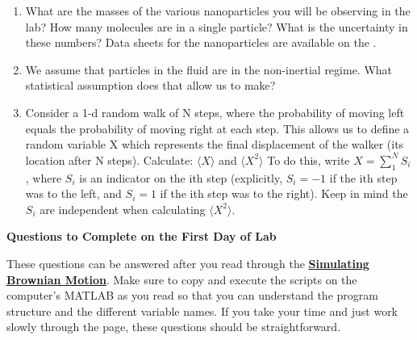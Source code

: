 \documentclass{../signatures}
\begin{document}
\maketitle

\names

\prelab

\begin{enumerate}

    \item What are the masses of the various nanoparticles you will be observing in the lab? How many molecules are in a single particle? What is the uncertainty in these numbers? Data sheets for the nanoparticles are available on the \ExpReprints.
    
    \item We assume that particles in the fluid are in the non-inertial regime. What statistical assumption does that allow us to make? 

    \item Consider a 1-d random walk of N steps, where the probability of moving left equals the probability of moving right at each step. This allows us to define a random variable X  which represents the final displacement of the walker (its location after N steps). Calculate: $\langle X \rangle$ and $\langle X^2\rangle$ To do this, write $X=\sum_{1}^{N} S_i $, where $S_i$ is an indicator on the ith step (explicitly, $S_i=-1$ if the ith step was to the left, and $S_i=1$ if the ith step was to the right). Keep in mind the $S_i$ are independent when calculating $\langle X^2\rangle$.
       \\[36pt]
\end{enumerate}

\prelabsignatures

\textbf{Questions to Complete on the First Day of Lab}

These questions can be answered after you read through the \href{http://experimentationlab.berkeley.edu/node/83}{\textbf{Simulating Brownian Motion}}. Make sure to copy and execute the scripts on the computer's MATLAB as you read so that you can understand the program structure and the different variable names. If you take your time and just work slowly through the page, these questions should be straightforward. 
\end{document}
